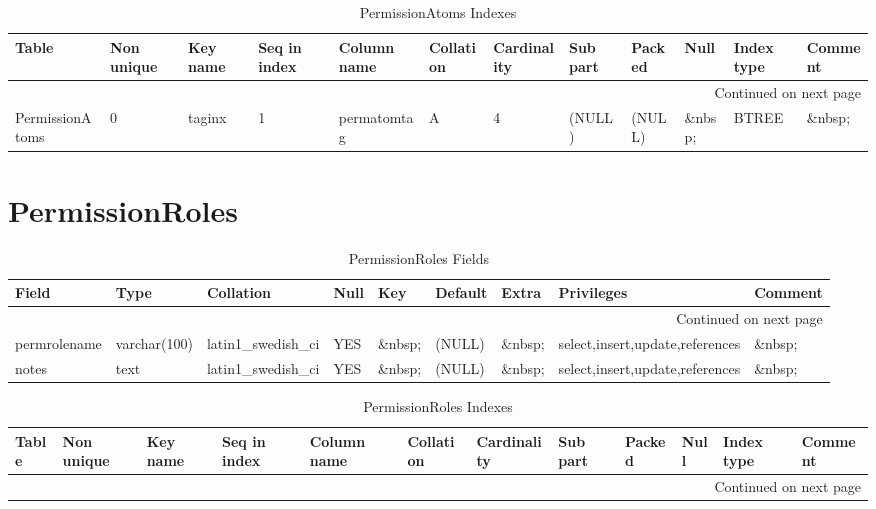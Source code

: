\documentclass[tablesignature]{scrartcl}
\begin{document}
\begin{longtable}{|l|l|l|l|l|l|l|l|l|l|l|l|}
\caption{PermissionAtoms Indexes} \label{tbl:permissionatomsindexes}\\
\hline
 Table            &  Non unique  &  Key name  &  Seq in index  &  Column name  &  Collation  &  Cardinality  &  Sub part  &  Packed  &  Null     &  Index type  &  Comment \\
\hline
\endhead
\hline\multicolumn{12}{r}{Continued on next page}\
\endfoot
\endlastfoot
\hline
 PermissionAtoms  &           0  &  PRIMARY   &             1  &  permatomid   &  A          &            4  &  (NULL)    &  (NULL)  &  \&nbsp;  &  BTREE       &  \&nbsp;  \\
 PermissionAtoms  &           0  &  taginx    &             1  &  permatomtag  &  A          &            4  &  (NULL)    &  (NULL)  &  \&nbsp;  &  BTREE       &  \&nbsp;  \\
\hline
\end{longtable}
\section{PermissionRoles}
\label{sec-14}


\begin{longtable}{|l|l|l|l|l|l|l|l|l|}
\caption{PermissionRoles Fields} \label{tbl:permissionrolesfields}\\
\hline
 Field         &  Type          &  Collation                &  Null     &  Key      &  Default  &  Extra              &  Privileges                       &  Comment \\
\hline
\endhead
\hline\multicolumn{9}{r}{Continued on next page}\
\endfoot
\endlastfoot
\hline
 permroleid    &  int(11)       &  NULL                     &  \&nbsp;  &  PRI      &  (NULL)   &  auto\_{}increment  &  select,insert,update,references  &  \&nbsp;  \\
 permrolename  &  varchar(100)  &  latin1\_{}swedish\_{}ci  &  YES      &  \&nbsp;  &  (NULL)   &  \&nbsp;            &  select,insert,update,references  &  \&nbsp;  \\
 notes         &  text          &  latin1\_{}swedish\_{}ci  &  YES      &  \&nbsp;  &  (NULL)   &  \&nbsp;            &  select,insert,update,references  &  \&nbsp;  \\
\hline
\end{longtable}


\begin{longtable}{|l|l|l|l|l|l|l|l|l|l|l|l|}
\caption{PermissionRoles Indexes} \label{tbl:permissionrolesindexes}\\
\hline
 Table            &  Non unique  &  Key name  &  Seq in index  &  Column name  &  Collation  &  Cardinality  &  Sub part  &  Packed  &  Null     &  Index type  &  Comment \\
\hline
\endhead
\hline\multicolumn{12}{r}{Continued on next page}\
\endfoot
\endlastfoot
\hline
 PermissionRoles  &           0  &  PRIMARY   &             1  &  permroleid   &  A          &            3  &  (NULL)    &  (NULL)  &  \&nbsp;  &  BTREE       &  \&nbsp;  \\
\hline
\end{longtable}
\end{document}
